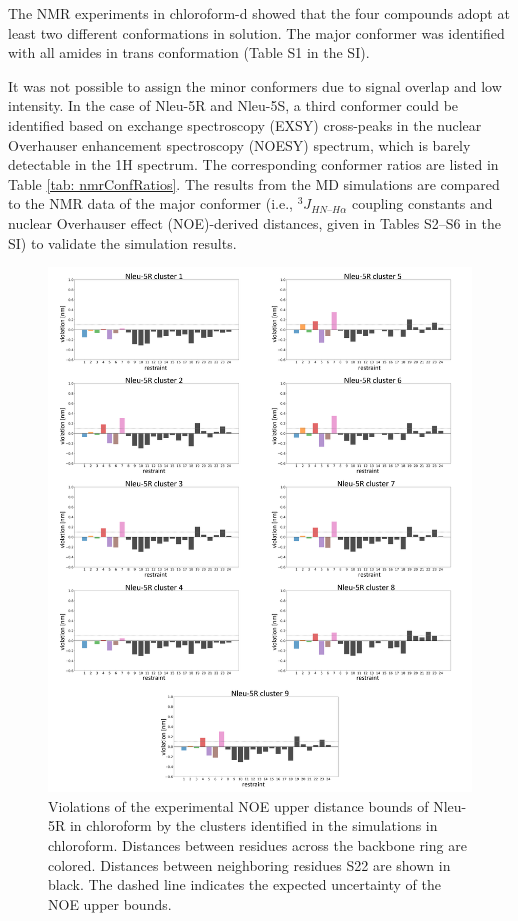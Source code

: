 The NMR experiments in chloroform-d showed that the four compounds adopt at least two different conformations in solution. 
The major conformer was identified with all amides in trans conformation (Table S1 in the SI). 

It was not possible to assign the minor conformers due to signal overlap and low intensity. In the case of Nleu-5R and Nleu-5S, a third conformer could be identified based on exchange spectroscopy (EXSY) cross-peaks in the nuclear Overhauser enhancement spectroscopy (NOESY) spectrum, which is barely detectable in the 1H spectrum. The corresponding conformer ratios are listed in Table \ref{tab: nmrConfRatios}. 
The results from the MD simulations are compared to the NMR data of the major conformer (i.e., $^3J_{HN–H\alpha}$ coupling constants and nuclear Overhauser effect (NOE)-derived distances, given in Tables S2–S6 in the SI) to validate the simulation results.
\begin{figure}
    \centering
    \includegraphics[width=\textwidth]{7_chapter_5/fig/results/NMR_5R.png}
    \caption{Violations  of  the  experimental  NOE  upper  distance  bounds  of  Nleu-5R  in chloroform by the clusters identified in the simulations in chloroform. Distances              between residues across the backbone ring are colored. Distances between neighboring residues S22 are shown in black. The dashed line indicates the expected uncertainty         of the NOE upper bounds.}
    \label{fig: SINOE violations Nleu-5R}
\end{figure}


